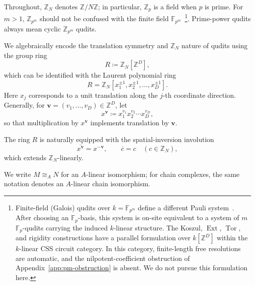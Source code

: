 \documentclass[aps,prx,english,superscriptaddress,twocolumn,tightenlines,showpacs,longbibliography,floatfix,amsfonts]{revtex4-2}
\theoremstyle{remark}
\theoremstyle{definition}
\begin{document}
	Throughout, \(\mathbb Z_N\) denotes \(\mathbb Z/N\mathbb Z\); in particular,
	\(\mathbb Z_p\) is a field when \(p\) is prime. For \(m>1\),
	\(\mathbb Z_{p^m}\) should not be confused with the finite field
	\(\mathbb F_{p^m}\)~\footnote{Finite-field (Galois) qudits over
		\(k=\mathbb F_{p^m}\) define a different Pauli
		system~\cite{Ketkar2006FiniteFields}. After choosing an
		\(\mathbb F_p\)-basis, this system is on-site equivalent to a system of \(m\)
		\(\mathbb F_p\)-qudits carrying the induced \(k\)-linear structure. The Koszul,
	\(\operatorname{Ext}\), \(\operatorname{Tor}\), and rigidity constructions
	have a parallel formulation over \(k[\mathbb Z^D]\) within the
	\(k\)-linear CSS circuit category. In this category, finite-length free
	resolutions are automatic, and the nilpotent-coefficient obstruction of
	Appendix~\ref{app:pm-obstruction} is absent. We do not pursue this
	formulation here.}. Prime-power qudits always mean cyclic
	\(\mathbb Z_{p^m}\) qudits.

We algebraically encode the translation symmetry and $ \mathbb Z_N $ nature of qudits using the group ring
\begin{equation}
	R\coloneqq \mathbb Z_N[\mathbb Z^D],
\end{equation}
which can be identified with the Laurent polynomial ring
\begin{equation}
	R = \mathbb{Z}_N[x_1^{\pm1},x_2^{\pm1},\dots,x_D^{\pm1}].
\end{equation}
Here \(x_j\) corresponds to a unit translation along the \(j\)-th coordinate direction.
Generally, for  $\mathbf{v}=(v_1,\dots,v_D)\in\mathbb{Z}^D$, let
\begin{equation}
	x^{\mathbf v}
	\coloneqq
	x_1^{v_1}x_2^{v_2}\cdots x_D^{v_D},
\end{equation}
so that multiplication by \(x^{\mathbf v}\) implements translation by \(\mathbf v\).

The ring $ R $ is naturally equipped with the spatial-inversion
involution
\begin{equation}
	\overline{x^{\mathbf v}}=x^{-\mathbf v},
	\qquad
	\overline{c}=c
	\quad
	(c\in\mathbb Z_N),
\end{equation}
which extends $\mathbb Z_N $-linearly.

We write \(M\cong_A N\) for an \(A\)-linear isomorphism; for chain
complexes, the same notation denotes an \(A\)-linear chain isomorphism.
\end{document}
